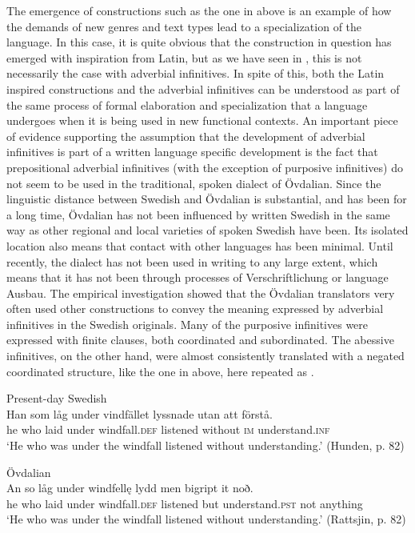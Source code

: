 \documentclass[output=paper]{langscibook}
\begin{document}
The emergence of constructions such as the one in  above is an example of how the demands of new genres and text types lead to a specialization of the language. In this case, it is quite obvious that the construction in question has emerged with inspiration from Latin, but as we have seen in , this is not necessarily the case with adverbial infinitives. In spite of this, both the Latin inspired constructions and the adverbial infinitives can be understood as part of the same process of formal elaboration and specialization that a language undergoes when it is being used in new functional contexts. An important piece of evidence supporting the assumption that the development of adverbial infinitives is part of a written language specific development is the fact that prepositional adverbial infinitives (with the exception of purposive infinitives) do not seem to be used in the traditional, spoken dialect of Övdalian. Since the linguistic distance between Swedish and Övdalian is substantial, and has been for a long time, Övdalian has not been influenced by written Swedish in the same way as other regional and local varieties of spoken Swedish have been. Its isolated location also means that contact with other languages has been minimal. Until recently, the dialect has not been used in writing to any large extent, which means that it has not been through processes of Verschriftlichung or language Ausbau. The empirical investigation showed that the Övdalian translators very often used other constructions to convey the meaning expressed by adverbial infinitives in the Swedish originals. Many of the purposive infinitives were expressed with finite clauses, both coordinated and subordinated. The abessive infinitives, on the other hand, were almost consistently translated with a negated coordinated structure, like the one in  above, here repeated as .


\ea
\label{ex:kalm:35}
\ea Present-day Swedish \\
\gll Han som låg under vindfället lyssnade utan att förstå.\\
 he who laid under windfall.\textsc{def} listened without \textsc{im} understand.\textsc{inf}\\
\glt ‘He who was under the windfall listened without understanding.’ (Hunden, p. 82)

\ex Övdalian\\
\gll An so låg under windfellę lydd men bigript it noð.\\
he who laid under windfall.\textsc{def} listened but understand.\textsc{pst} not anything\\
\glt ‘He who was under the windfall listened without understanding.’ (Rattsjin, p. 82)
\z
\z
\end{document}
